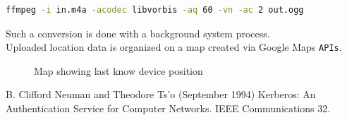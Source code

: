 \documentclass[conference]{IEEEtran}
\begin{document}
\begin{lstlisting}[language=Bash, caption=FFMPEG command to convert aac to mp3]
ffmpeg -i in.m4a -acodec libvorbis -aq 60 -vn -ac 2 out.ogg
\end{lstlisting}

Such a conversion is done with a background system process.\\

Uploaded location data is organized on a map created via Google Maps \texttt{APIs}.

\begin{figure}[!ht]
\begin{center}
\caption{Map showing last know device position}
\label{img:slideshow}
\end{center}
\end{figure}

\begin{thebibliography}{1}

\bibitem{}
B. Clifford Neuman and Theodore Ts'o (September 1994) Kerberos: An Authentication Service for Computer Networks.  IEEE Communications 32. \\

\end{thebibliography}

\end{document}

